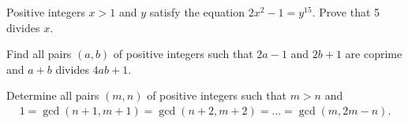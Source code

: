 \documentclass{subfile}
\begin{document}
	\begin{problem}
		Positive integers $x>1$ and $y$ satisfy the equation $2x^2-1=y^{15}$. Prove that 5 divides $x$. %
	\end{problem}


	\begin{problem}
		Find all pairs $(a,b)$ of positive integers such that $2a-1$ and $2b+1$ are coprime and $a+b$ divides $4ab+1.$ %
	\end{problem}




	\begin{problem}
		Determine all pairs $(m, n)$ of positive integers such that $m>n$ and
			\begin{align*}
				1 = \gcd(n+1,m+1) = \gcd(n+2,m+2) = \dots = \gcd(m,2m-n).
			\end{align*}
	\end{problem}
\end{document}
